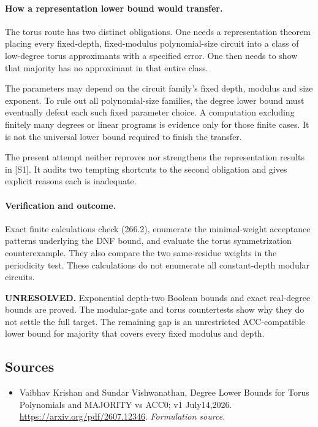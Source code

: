 \documentclass[11pt]{article}
\begin{document}
\paragraph{How a representation lower bound would transfer.}
The torus route has two distinct obligations. One needs a representation theorem placing every fixed-depth, fixed-modulus polynomial-size circuit into a class of low-degree torus approximants with a specified error. One then needs to show that majority has no approximant in that entire class.

The parameters may depend on the circuit family's fixed depth, modulus and size exponent. To rule out all polynomial-size families, the degree lower bound must eventually defeat each such fixed parameter choice. A computation excluding finitely many degrees or linear programs is evidence only for those finite cases. It is not the universal lower bound required to finish the transfer.

The present attempt neither reproves nor strengthens the representation results in [S1]. It audits two tempting shortcuts to the second obligation and gives explicit reasons each is inadequate.

\paragraph{Verification and outcome.}
Exact finite calculations check (266.2), enumerate the minimal-weight acceptance patterns underlying the DNF bound, and evaluate the torus symmetrization counterexample. They also compare the two same-residue weights in the periodicity test. These calculations do not enumerate all constant-depth modular circuits.

\textbf{UNRESOLVED.} Exponential depth-two Boolean bounds and exact real-degree bounds are proved. The modular-gate and torus countertests show why they do not settle the full target. The remaining gap is an unrestricted ACC-compatible lower bound for majority that covers every fixed modulus and depth.

\subsection{Sources}
\begin{itemize}
\item[S1]Vaibhav Krishan and Sundar Vishwanathan, Degree Lower Bounds for Torus Polynomials and MAJORITY vs ACC0; v1 July14,2026.
\url{https://arxiv.org/pdf/2607.12346}.
\textit{Formulation source.}
\end{itemize}
\end{document}

